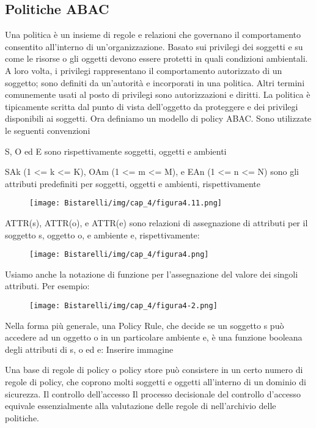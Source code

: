 \subsection{Politiche ABAC}

Una politica è un insieme di regole e relazioni che governano il comportamento consentito all'interno di un'organizzazione. Basato sui privilegi dei soggetti e su come le risorse o gli oggetti devono essere protetti in quali condizioni ambientali. A loro volta, i privilegi rappresentano il comportamento autorizzato di un soggetto; sono definiti da un'autorità e incorporati in una politica. Altri termini comunemente usati al posto di privilegi sono autorizzazioni e diritti. La politica è tipicamente scritta dal punto di vista dell'oggetto da proteggere e dei privilegi disponibili ai soggetti. Ora definiamo un modello di policy ABAC. Sono utilizzate le seguenti convenzioni


S, O ed E sono rispettivamente soggetti, oggetti e ambienti

SAk (1 <= k <= K), OAm (1 <= m <= M), e EAn (1 <= n <= N) sono gli attributi predefiniti per soggetti, oggetti e ambienti, rispettivamente

\begin{figure}[H]
	\centering
    \texttt{[image: Bistarelli/img/cap\_4/figura4.11.png]}
\end{figure}

ATTR(s), ATTR(o), e ATTR(e) sono relazioni di assegnazione di attributi per il soggetto s, oggetto o, e ambiente e, rispettivamente:

\begin{figure}[H]
	\centering
    \texttt{[image: Bistarelli/img/cap\_4/figura4.png]}
\end{figure}

Usiamo anche la notazione di funzione per l'assegnazione del valore dei singoli attributi. Per esempio:

\begin{figure}[H]
	\centering
    \texttt{[image: Bistarelli/img/cap\_4/figura4-2.png]}
\end{figure}

Nella forma più generale, una Policy Rule, che decide se un soggetto s può accedere ad un oggetto o in un particolare ambiente e, è una funzione booleana degli attributi di s, o ed e:
Inserire immagine

Una base di regole di policy o policy store può consistere in un certo numero di regole di policy, che coprono molti soggetti e oggetti all'interno di un dominio di sicurezza. Il controllo dell'accesso Il processo decisionale del controllo d'accesso equivale essenzialmente alla valutazione delle regole di nell'archivio delle politiche.

